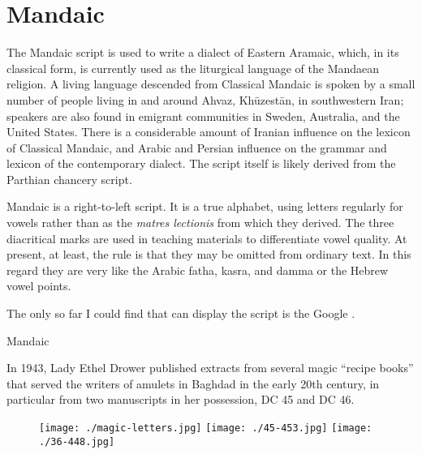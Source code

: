 

\section{Mandaic}
\label{s:mandaic}
\newfontfamily{}


The Mandaic script is used to write a dialect of Eastern Aramaic, which, in its classical
form, is currently used as the liturgical language of the Mandaean religion. A living language descended
from Classical Mandaic is spoken by a small number of people living in and around Ahvaz, Khūzestān,
in southwestern Iran; speakers are also found in emigrant communities in Sweden, Australia, and the
United States. There is a considerable amount of Iranian influence on the lexicon of Classical Mandaic,
and Arabic and Persian influence on the grammar and lexicon of the contemporary dialect. The script
itself is likely derived from the Parthian chancery script.

Mandaic is a right-to-left script. It is a true alphabet, using letters regularly for vowels
rather than as the \emph{matres lectionis} from which they derived. The three diacritical marks are used in
teaching materials to differentiate vowel quality. At present, at least, the rule is that they may be omitted
from ordinary text. In this regard they are very like the Arabic fatha, kasra, and damma or the Hebrew
vowel points.

The only so far I could find that can display the script is the Google .

\begin{scriptexample}[]{Mandaic}
\bgroup
{}
\egroup
\end{scriptexample}

In 1943, Lady Ethel Drower published extracts from several magic “recipe books” that served the writers of amulets in Baghdad in the early 20th century, in particular from two manuscripts in her possession, DC 45 and DC 46.

\begin{figure}[hb]
\centering

\texttt{[image: ./magic-letters.jpg]}
\texttt{[image: ./45-453.jpg]}
\texttt{[image: ./36-448.jpg]}

\end{figure}


